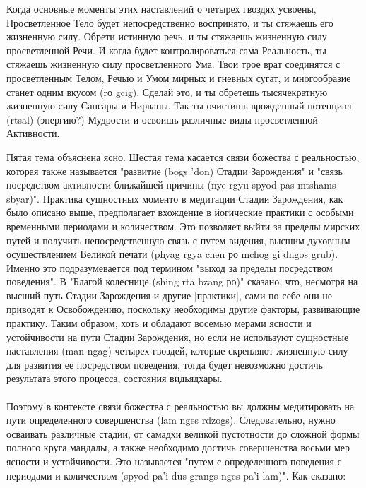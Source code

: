 Когда основные моменты этих наставлений о четырех гвоздях усвоены,
Просветленное Тело будет непосредственно воспринято, и ты стяжаешь его жизненную
силу. Обрети истинную речь, и ты стяжаешь жизненную силу просветленной Речи. И когда
будет контролироваться сама Реальность, ты стяжаешь жизненную силу просветленного
Ума. Твои трое врат соединятся с просветленным Телом, Речью и Умом мирных и гневных
сугат, и многообразие станет одним вкусом (rо gcig). Сделай это, и ты обретешь
тысячекратную жизненную силу Сансары и Нирваны. Так ты очистишь врожденный
потенциал (rtsal) (энергию?) Мудрости и освоишь различные виды просветленной
Активности.
\\
\begin{siderules}
Пятая тема объяснена ясно. Шестая тема касается связи божества с реальностью, которая
также называется "развитие (bogs 'don) Стадии Зарождения" и "связь посредством
активности ближайшей причины (nye rgyu spyod pas mtshams sbyar)". Практика сущностных
моменто в медитации Стадии Зарождения, как было описано выше, предполагает вхождение
в йогические практики с особыми временными периодами и количеством. Это позволяет
выйти за пределы мирских путей и получить непосредственную связь с путем видения,
высшим духовным осуществлением Великой печати (phyag rgya chen ро mchog gi dngos grub).
Именно это подразумевается под термином "выход за пределы посредством поведения".
В "Благой колеснице (shing rta bzang ро)" сказано, что, несмотря на высший путь Стадии
Зарождения и другие [практики], сами по себе они не приводят к Освобождению, поскольку
необходимы другие факторы, развивающие практику. Таким образом, хоть и обладают
восемью мерами ясности и устойчивости на пути Стадии Зарождения, но если не используют
сущностные наставления (man ngag) четырех гвоздей, которые скрепляют жизненную силу
для развития ее посредством поведения, тогда будет невозможно достичь результата этого
процесса, состояния видьядхары.\\
\\
Поэтому в контексте связи божества с реальностью вы должны медитировать на пути
определенного совершенства (lam nges rdzogs). Следовательно, нужно осваивать различные
стадии, от самадхи великой пустотности до сложной формы полного круга мандалы, а также
необходимо достичь совершенства восьми мер ясности и устойчивости. Это называется
"путем с определенного поведения с периодами и количеством (spyod pa'i dus grangs nges pa'i lam)".
Как сказано:


\end{siderules}
